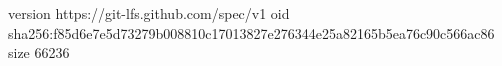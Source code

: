 version https://git-lfs.github.com/spec/v1
oid sha256:f85d6e7e5d73279b008810c17013827e276344e25a82165b5ea76c90c566ac86
size 66236
